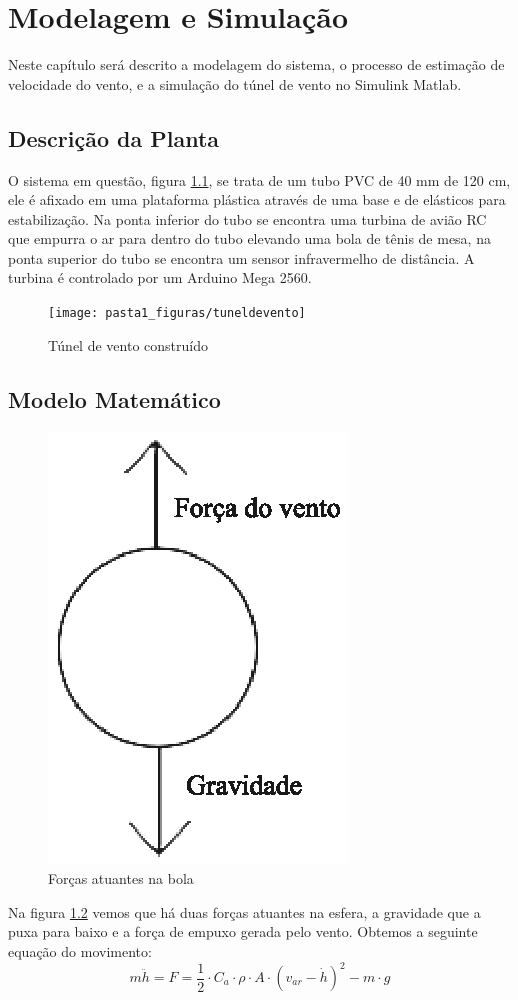 \chapter{Modelagem e Simulação} \label{cap3}

Neste capítulo será descrito a modelagem do sistema, o processo de estimação de velocidade do vento, e a simulação do túnel de vento no Simulink Matlab.

\section{Descrição da Planta}
O sistema em questão, figura \ref{fig:tuneldevento}, se trata de um tubo PVC de 40 mm de 120 cm, ele é afixado em uma plataforma plástica através de uma base e de elásticos para estabilização. Na ponta inferior do tubo se encontra uma turbina de avião RC que empurra o ar para dentro do tubo elevando uma bola de tênis de mesa, na ponta superior do tubo se encontra um sensor infravermelho de distância. A turbina é controlado por um Arduino Mega 2560.

\begin{figure}
	\centering
	\texttt{[image: pasta1\_figuras/tuneldevento]}
	\caption[Túnel de vento construído]{Túnel de vento construído}
	\label{fig:tuneldevento}
\end{figure}


\section{Modelo Matemático}


\begin{figure}[htb]
	\centering
	\includegraphics[width=0.3\linewidth]{pasta1_figuras/forcasatuantes}
	\caption[Forças atuantes na bola]{Forças atuantes na bola}
	\label{fig:forcasatuantes}
\end{figure}



Na figura \ref{fig:forcasatuantes} vemos que há duas forças atuantes na esfera, a gravidade que a puxa para baixo e a força de empuxo gerada pelo vento. Obtemos a seguinte equação do movimento:
\begin{equation}
m \ddot{h}=F=\dfrac{1}{2} \cdot C_a \cdot\rho \cdot A \cdot (v_{ar}- \dot{h})^2-m\cdot g
\end{equation}

